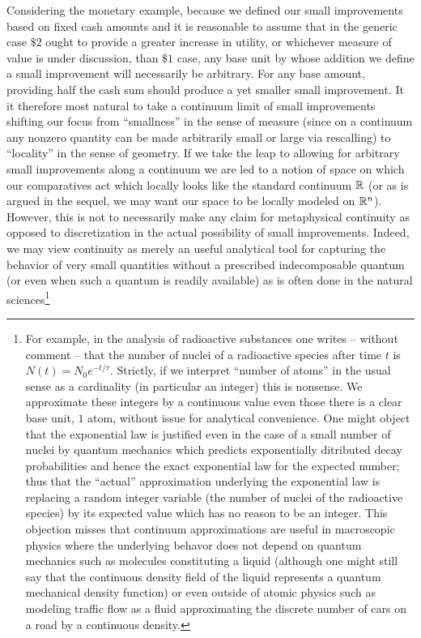 \documentclass[12pt]{article}
\begin{document}
Considering the monetary example, because we defined our small improvements based on fixed cash amounts and it is reasonable to assume that in the generic case $\$ 2$ ought to provide a greater increase in utility, or whichever measure of value is under discussion, than $\$ 1$ case, any base unit by whose addition we define a small improvement will necessarily be arbitrary. For any base amount, providing half the cash sum should produce a yet smaller small improvement. It it therefore most natural to take a continuum limit of small improvements shifting our focus from ``smallness'' in the sense of measure (since on a continuum any nonzero quantity can be made arbitrarily small or large via rescalling) to ``locality'' in the sense of geometry. If we take the leap to allowing for arbitrary small improvements along a continuum we are led to a notion of space on which our comparatives act which locally looks like the standard continuum $\mathbb{R}$ (or as is argued in the sequel, we may want our space to be locally modeled on $\mathbb{R}^n$). However, this is not to necessarily make any claim for metaphysical continuity as opposed to discretization in the actual possibility of small improvements. Indeed, we may view continuity as merely an useful analytical tool for capturing the behavior of very small quantities without a prescribed indecomposable quantum (or even when such a quantum is readily available) as is often done in the natural sciences\footnote{For example, in the analysis of radioactive substances one writes -- without comment -- that the number of nuclei of a radioactive species after time $t$ is $N(t) = N_0 e^{-t / \tau}$. Strictly, if we interpret ``number of atoms'' in the usual sense as a cardinality (in particular an integer) this is nonsense. We approximate these integers by a continuous value even those there is a clear base unit, $1$ atom, without issue for analytical convenience. One might object that the exponential law is justified even in the case of a small number of nuclei by quantum mechanics which predicts exponentially ditributed decay probabilities and hence the exact exponential law for the expected number; thus that the ``actual'' approximation underlying the exponential law is replacing a random integer variable (the number of nuclei of the radioactive species) by its expected value which has no reason to be an integer. This objection misses that continuum approximations are useful in macroscopic physics where the underlying behavor does not depend on quantum mechanics such as molecules constituting a liquid (although one might still say that the continuous density field of the liquid represents a quantum mechanical density function) or even outside of atomic physics such as modeling traffic flow as a fluid approximating the discrete number of cars on a road by a continuous density.}
\end{document}
